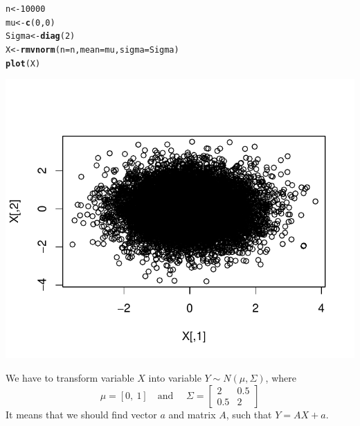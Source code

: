 \documentclass[12pt, a4paper]{article}\usepackage[]{graphicx}\usepackage[]{color}
\makeatletter
\def\maxwidth{ %
  \ifdim\Gin@nat@width>\linewidth
    \linewidth
  \else
    \Gin@nat@width
  \fi
}
\newcommand{\hlnum}[1]{\textcolor[rgb]{0.686,0.059,0.569}{#1}}%
\newcommand{\hlstd}[1]{\textcolor[rgb]{0.345,0.345,0.345}{#1}}%
\newcommand{\hlkwb}[1]{\textcolor[rgb]{0.69,0.353,0.396}{#1}}%
\newcommand{\hlkwc}[1]{\textcolor[rgb]{0.333,0.667,0.333}{#1}}%
\newcommand{\hlkwd}[1]{\textcolor[rgb]{0.737,0.353,0.396}{\textbf{#1}}}%
\newenvironment{kframe}{%
 \def\at@end@of@kframe{}%
 \ifinner\ifhmode%
  \def\at@end@of@kframe{\end{minipage}}%
  \begin{minipage}{\columnwidth}%
 \fi\fi%
 \def\FrameCommand##1{\hskip\@totalleftmargin \hskip-\fboxsep
 \colorbox{shadecolor}{##1}\hskip-\fboxsep
     \hskip-\linewidth \hskip-\@totalleftmargin \hskip\columnwidth}%
 \MakeFramed {\advance\hsize-\width
   \@totalleftmargin\z@ \linewidth\hsize
   \@setminipage}}%
 {\par\unskip\endMakeFramed%
 \at@end@of@kframe}
\newenvironment{knitrout}{}{} %
\makeatother
\begin{document}
\begin{knitrout}
\color{fgcolor}\begin{kframe}
\begin{alltt}
\hlstd{n} \hlkwb{<-} \hlnum{10000}
\hlstd{mu} \hlkwb{<-} \hlkwd{c}\hlstd{(}\hlnum{0}\hlstd{,} \hlnum{0}\hlstd{)}
\hlstd{Sigma} \hlkwb{<-} \hlkwd{diag}\hlstd{(}\hlnum{2}\hlstd{)}
\hlstd{X} \hlkwb{<-} \hlkwd{rmvnorm}\hlstd{(}\hlkwc{n} \hlstd{= n,} \hlkwc{mean} \hlstd{= mu,} \hlkwc{sigma} \hlstd{=  Sigma)}
\hlkwd{plot}\hlstd{(X)}
\end{alltt}
\end{kframe}

{\centering \includegraphics[width=\maxwidth]{figure/ex2X-1} 

}



\end{knitrout}

We have to transform variable $X$ into variable $Y \sim N(\mu, \Sigma)$, where 
\[\mu = \left[0,\ 1\right] \quad \text{and }\quad 
  \Sigma = \left[
    \begin{matrix}  
      2   & 0.5 \\
      0.5 & 2
    \end{matrix} 
    \right]
\]
It means that we should find vector $a$ and matrix $A$, such that $Y=A X + a$. 

\end{document}
